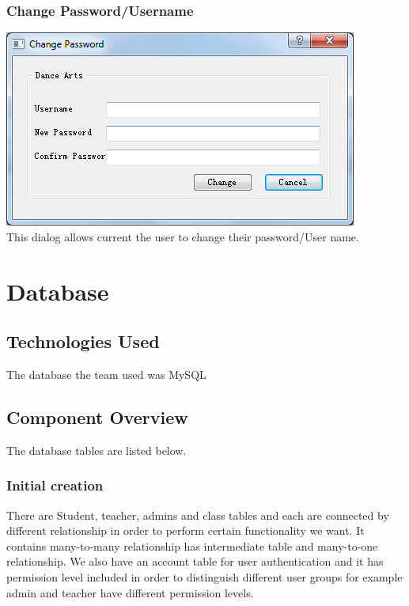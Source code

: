 \subsubsection{Change Password/Username}
\includegraphics[scale=0.5]{pics/change_pass.png}\\
This dialog allows current the user to change their password/User name.\\



\section{Database}

\subsection{Technologies  Used}
The database the team used was MySQL

\subsection{Component  Overview}
The database tables are listed below.


\subsubsection{Initial creation}
There are Student, teacher, admins and class tables and each are connected by different relationship in order to perform certain functionality we want. It contains many-to-many relationship has intermediate table and many-to-one relationship. We also have an account table for user authentication and it has permission level included in order to distinguish different user groups for example admin and teacher have different permission levels.\\

